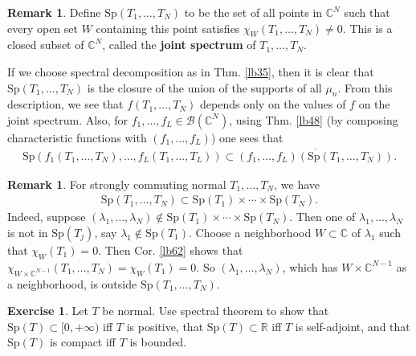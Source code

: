 \documentclass[12pt,b5paper,notitlepage]{article}
\theoremstyle{definition}
\newtheorem{exe}[df]{Exercise}
\newtheorem{rem}[df]{Remark}
\theoremstyle{plain}
\newcommand{\ovl}{\overline}
\newcommand{\scr}{\mathscr}
\newcommand{\Cbb}{\mathbb C}
\newcommand{\Rbb}{\mathbb R}
\newcommand{\Sp}{\mathrm{Sp}}
\numberwithin{equation}{section}
\begin{document}
\begin{rem}
Define $\Sp(T_1,\dots,T_N)$ \index{Sp@$\Sp(T_1,\dots,T_N)$} to be the set of all points in $\Cbb^N$ such that every open set $W$ containing this point satisfies $\chi_W(T_1,\dots,T_N)\neq 0$. This is a closed subset of $\Cbb^N$, called the \textbf{joint spectrum} of $T_1,\dots,T_N$. 

If we choose spectral decomposition as in Thm. \ref{lb35}, then it is clear that $\Sp(T_1,\dots,T_N)$ is the closure of the union of the supports of all $\mu_n$. From this description, we see that $f(T_1,\dots,T_N)$ depends only on the values of $f$ on the joint spectrum. Also, for $f_1,\dots,f_L\in\scr B(\Cbb^N)$,  using Thm. \ref{lb48} (by composing characteristic functions with $(f_1,\dots,f_L)$) one sees that
\begin{align}
\Sp(f_1(T_1,\dots,T_N),\dots,f_L(T_1,\dots,T_L))\subset\ovl{(f_1,\dots,f_L)(\Sp(T_1,\dots,T_N))}.
\end{align}
\end{rem}



\begin{rem}
For strongly commuting normal $T_1,\dots,T_N$, we have
\begin{align}
\Sp(T_1,\dots,T_N)\subset\Sp(T_1)\times\cdots\times\Sp(T_N).	
\end{align}
Indeed, suppose $(\lambda_1,\dots,\lambda_N)\notin \Sp(T_1)\times\cdots\times\Sp(T_N)$. Then one of $\lambda_1,\dots,\lambda_N$ is not in $\Sp(T_j)$, say $\lambda_1\notin\Sp(T_1)$. Choose a neighborhood $W\subset\Cbb$ of $\lambda_1$ such that $\chi_W(T_1)=0$. Then Cor. \ref{lb62} shows that $\chi_{W\times\Cbb^{N-1}}(T_1,\dots,T_N)=\chi_W(T_1)=0$. So $(\lambda_1,\dots,\lambda_N)$, which has $W\times\Cbb^{N-1}$ as a neighborhood, is outside $\Sp(T_1,\dots,T_N)$.
\end{rem}


\begin{exe}
Let $T$ be normal. Use spectral theorem to show that $\Sp(T)\subset[0,+\infty)$ iff $T$ is positive,  that $\Sp(T)\subset\Rbb$ iff $T$ is self-adjoint, and that $\Sp(T)$  is compact iff $T$ is bounded.
\end{exe}
\end{document}
